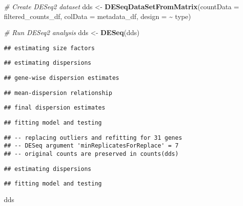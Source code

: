 \documentclass[
]{article}
\newenvironment{Shaded}{\begin{snugshade}}{\end{snugshade}}
\newcommand{\AttributeTok}[1]{\textcolor[rgb]{0.13,0.29,0.53}{#1}}
\newcommand{\CommentTok}[1]{\textcolor[rgb]{0.56,0.35,0.01}{\textit{#1}}}
\newcommand{\FunctionTok}[1]{\textcolor[rgb]{0.13,0.29,0.53}{\textbf{#1}}}
\newcommand{\NormalTok}[1]{#1}
\newcommand{\OtherTok}[1]{\textcolor[rgb]{0.56,0.35,0.01}{#1}}
\newcommand{\SpecialCharTok}[1]{\textcolor[rgb]{0.81,0.36,0.00}{\textbf{#1}}}
\begin{document}
\begin{Shaded}
\begin{Highlighting}[]
\CommentTok{\# Create DESeq2 dataset}
\NormalTok{dds }\OtherTok{\textless{}{-}} \FunctionTok{DESeqDataSetFromMatrix}\NormalTok{(}\AttributeTok{countData =}\NormalTok{ filtered\_counts\_df, }\AttributeTok{colData =}\NormalTok{ metadata\_df, }\AttributeTok{design =} \SpecialCharTok{\textasciitilde{}}\NormalTok{ type)}

\CommentTok{\# Run DESeq2 analysis}
\NormalTok{dds }\OtherTok{\textless{}{-}} \FunctionTok{DESeq}\NormalTok{(dds)}
\end{Highlighting}
\end{Shaded}

\begin{verbatim}
## estimating size factors
\end{verbatim}

\begin{verbatim}
## estimating dispersions
\end{verbatim}

\begin{verbatim}
## gene-wise dispersion estimates
\end{verbatim}

\begin{verbatim}
## mean-dispersion relationship
\end{verbatim}

\begin{verbatim}
## final dispersion estimates
\end{verbatim}

\begin{verbatim}
## fitting model and testing
\end{verbatim}

\begin{verbatim}
## -- replacing outliers and refitting for 31 genes
## -- DESeq argument 'minReplicatesForReplace' = 7 
## -- original counts are preserved in counts(dds)
\end{verbatim}

\begin{verbatim}
## estimating dispersions
\end{verbatim}

\begin{verbatim}
## fitting model and testing
\end{verbatim}

\begin{Shaded}
\begin{Highlighting}[]
\NormalTok{dds}
\end{Highlighting}
\end{Shaded}
\end{document}
